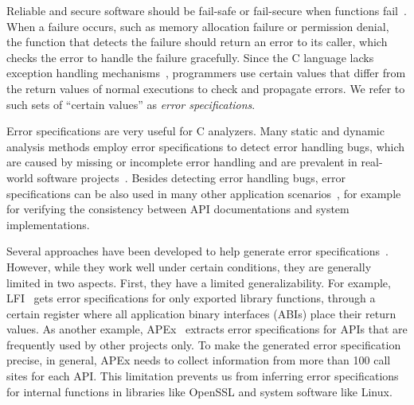 \documentclass[12pt]{report}	%
\begin{document}

%
Reliable and secure software should be fail-safe or fail-secure when
functions fail~\cite{cristian1982exception}.
When a failure occurs, 
such as memory allocation failure or permission denial,
the function that detects the failure should 
return an error
to its caller, which checks the error to handle the 
failure gracefully.
Since the C language lacks exception handling mechanisms~\cite{Goodenough:1975:SEH:512976.512997},
programmers use certain values that differ from
the return values of normal executions to check and propagate errors.
%
We refer to such sets of ``certain values'' 
as \emph{error specifications}.

Error specifications are very useful for C analyzers.
%
Many static and dynamic analysis methods
\cite{jana2016automatically,Rubio-Gonzalez:2009:EPA:1542476.1542506,Tian:2017:ADR,
marinescu2011efficient,susskraut2006automatically,gunawi2008eio}
employ error specifications
to detect error handling bugs,
which are caused by missing or incomplete error handling and 
are prevalent in real-world software projects~\cite{OWASP2007}.
%
Besides detecting error handling bugs, 
error specifications can be also used in many other application scenarios~\cite{myers2016improving,weimer2005mining,rubio2010expect,cheon2007automated,Dillig:2007:SED:1250734.1250784},
for example for 
verifying the consistency between API documentations and system implementations.

Several approaches have been developed to 
help generate error specifications~\cite{marinescu2011efficient,Acharya:2009:MAE,Kang:2016:AAI:2970276.2970354}. 
%
However, while they work well under certain conditions, they 
are generally limited in two aspects. 
%
First, they have a limited generalizability. For example, 
LFI~\cite{marinescu2011efficient} gets error specifications for only exported library functions,
through a certain register
where all application binary interfaces (ABIs) place their return values.
%
As another example, 
APEx~\cite{Kang:2016:AAI:2970276.2970354} extracts
error specifications for APIs that are frequently used by other projects only. 
%
To make the generated error specification precise,
in general, APEx needs to collect information from more than 100 call sites for each API.
This limitation prevents us from inferring 
error specifications for internal functions in libraries 
like OpenSSL and system software like Linux.
\end{document}
